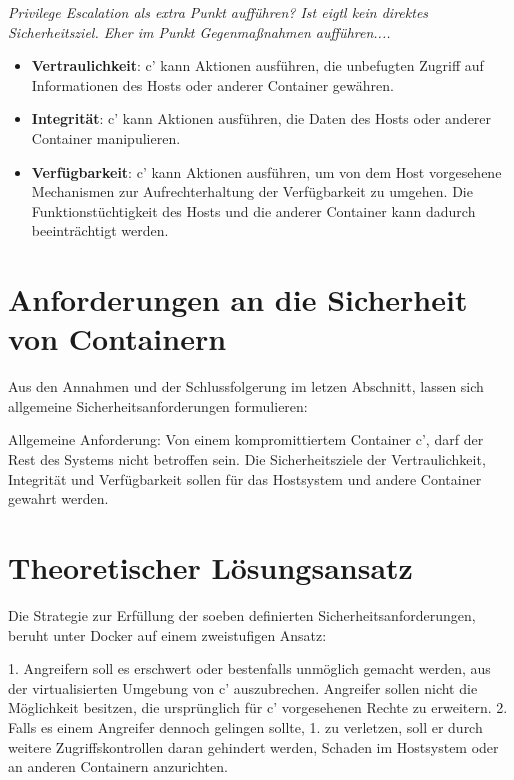 \documentclass[../main.tex]{subfiles}
\begin{document}
    \emph{Privilege Escalation als extra Punkt aufführen? Ist eigtl kein direktes Sicherheitsziel. Eher im Punkt Gegenmaßnahmen aufführen....}

    \begin{itemize}
      \item \textbf{Vertraulichkeit}: c' kann Aktionen ausführen, die unbefugten Zugriff auf Informationen des Hosts oder anderer Container gewähren.
      \item \textbf{Integrität}: c' kann Aktionen ausführen, die Daten des Hosts oder anderer Container manipulieren.
      \item \textbf{Verfügbarkeit}: c' kann Aktionen ausführen, um von dem Host vorgesehene Mechanismen zur Aufrechterhaltung der Verfügbarkeit zu umgehen. Die Funktionstüchtigkeit des Hosts und die anderer Container kann dadurch beeinträchtigt werden.
    \end{itemize}


  \section{Anforderungen an die Sicherheit von Containern}
    Aus den Annahmen und der Schlussfolgerung im letzen Abschnitt, lassen sich allgemeine Sicherheitsanforderungen formulieren:

    Allgemeine Anforderung: Von einem kompromittiertem Container c', darf der Rest des Systems nicht betroffen sein. Die Sicherheitsziele der Vertraulichkeit, Integrität und Verfügbarkeit sollen für das Hostsystem und andere Container gewahrt werden.

  \section{Theoretischer Lösungsansatz}
    Die Strategie zur Erfüllung der soeben definierten Sicherheitsanforderungen, beruht unter Docker auf einem zweistufigen Ansatz:

    1. Angreifern soll es erschwert oder bestenfalls unmöglich gemacht werden, aus der virtualisierten Umgebung von c' auszubrechen. Angreifer sollen nicht die Möglichkeit besitzen, die ursprünglich für c' vorgesehenen Rechte zu erweitern.
    2. Falls es einem Angreifer dennoch gelingen sollte, 1. zu verletzen, soll er durch weitere Zugriffskontrollen daran gehindert werden, Schaden im Hostsystem oder an anderen Containern anzurichten.
\end{document}
